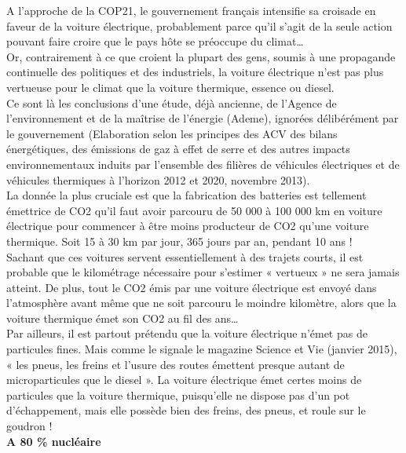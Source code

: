 \documentclass[8pt]{article}
\begin{document}
A l’approche de la COP21, le gouvernement français intensifie sa croisade en faveur de la voiture électrique, probablement parce qu’il s’agit de la seule action pouvant faire croire que le pays hôte se préoccupe du climat… \\

Or, contrairement à ce que croient la plupart des gens, soumis à une propagande continuelle des politiques et des industriels, la voiture électrique n’est pas plus vertueuse pour le climat que la voiture thermique, essence ou diesel. \\

Ce sont là les conclusions d’une étude, déjà ancienne, de l’Agence de l’environnement et de la maîtrise de l’énergie (Ademe), ignorées délibérément par le gouvernement (Elaboration selon les principes des ACV des bilans énergétiques, des émissions de gaz à effet de serre et des autres impacts environnementaux induits par l’ensemble des filières de véhicules électriques et de véhicules thermiques à l’horizon 2012 et 2020, novembre 2013). \\

La donnée la plus cruciale est que la fabrication des batteries est tellement émettrice de CO2 qu’il faut avoir parcouru de 50 000 à 100 000 km en voiture électrique pour commencer à être moins producteur de CO2 qu’une voiture thermique. Soit 15 à 30 km par jour, 365 jours par an, pendant 10 ans ! \\

Sachant que ces voitures servent essentiellement à des trajets courts, il est probable que le kilométrage nécessaire pour s’estimer « vertueux » ne sera jamais atteint. De plus, tout le CO2 émis par une voiture électrique est envoyé dans l’atmosphère avant même que ne soit parcouru le moindre kilomètre, alors que la voiture thermique émet son CO2 au fil des ans… \\

Par ailleurs, il est partout prétendu que la voiture électrique n’émet pas de particules fines. Mais comme le signale le magazine Science et Vie (janvier 2015), « les pneus, les freins et l’usure des routes émettent presque autant de microparticules que le diesel ». La voiture électrique émet certes moins de particules que la voiture thermique, puisqu’elle ne dispose pas d’un pot d’échappement, mais elle possède bien des freins, des pneus, et roule sur le goudron ! \\

\textbf{A 80 \% nucléaire}
\end{document}
